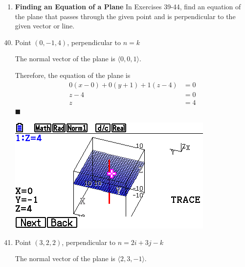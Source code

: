 \newpage
\begin{enumerate}[label={},leftmargin=*]
    \item \textbf{Finding an Equation of a Plane} In Exercises 39-44, find an equation of the plane that passes through the given point and is perpendicular to the given vector or line.
\end{enumerate}

\begin{enumerate}
    \setcounter{enumi}{39}
    \item Point $(0, -1, 4)$, perpendicular to $n = k$

          \sol{} The normal vector of the
          plane is $\langle 0, 0, 1 \rangle$.

          Therefore, the equation of the plane is
          \begin{align*}
              0(x - 0) + 0(y + 1) + 1(z - 4) & = 0 \\
              z - 4                          & = 0 \\
              z                              & = 4
          \end{align*} \hfill $\blacksquare$
          \begin{center}
              \includegraphics[scale=0.5]{assets/larson11.5q40graph.png}
          \end{center}

    \item Point $(3, 2, 2)$, perpendicular to $n = 2i + 3j - k$

          \sol{} The normal vector
          of the plane is $\langle 2, 3, -1 \rangle$.


\end{enumerate}
